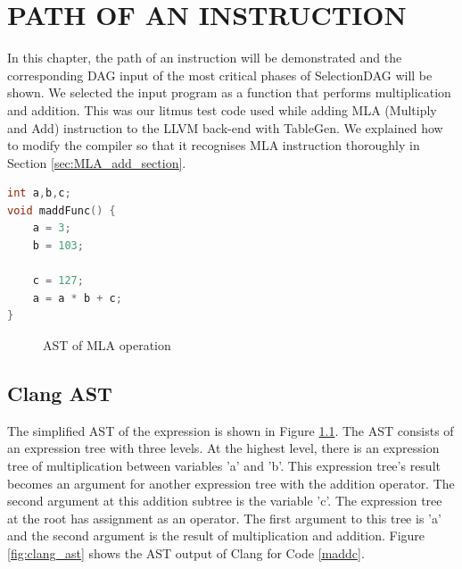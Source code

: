 
\clearpage
\chapter{PATH OF AN INSTRUCTION}\label{Ch4}
In this chapter, the path of an instruction will be demonstrated and the corresponding DAG input of the most critical phases of SelectionDAG will be shown. We selected the input program as a function that performs multiplication and addition. This was our litmus test code used while adding MLA (Multiply and Add) instruction to the LLVM back-end with TableGen. We explained how to modify the compiler so that it recognises MLA instruction thoroughly in Section \ref{sec:MLA_add_section}. 

\begin{lstlisting}[language=C, caption=madd.c program, label=maddc]
int a,b,c;
void maddFunc() {
	a = 3;
	b = 103;
	
	c = 127;
	a = a * b + c;
}
\end{lstlisting}

\begin{figure}
    \centering
{}
    \caption{AST of MLA operation}
    \label{fig:ast_mla}
\end{figure}

\section{Clang AST}
The simplified AST of the expression is shown in Figure \ref{fig:ast_mla}. The AST consists of an expression tree with three levels. At the highest level, there is an expression tree of multiplication between variables 'a' and 'b'. This expression tree's result becomes an argument for another expression tree with the addition operator. The second argument at this addition subtree is the variable 'c'. The expression tree at the root has assignment as an operator. The first argument to this tree is 'a' and the second argument is the result of multiplication and addition. Figure \ref{fig:clang_ast} shows the AST output of Clang for Code \ref{maddc}. 

